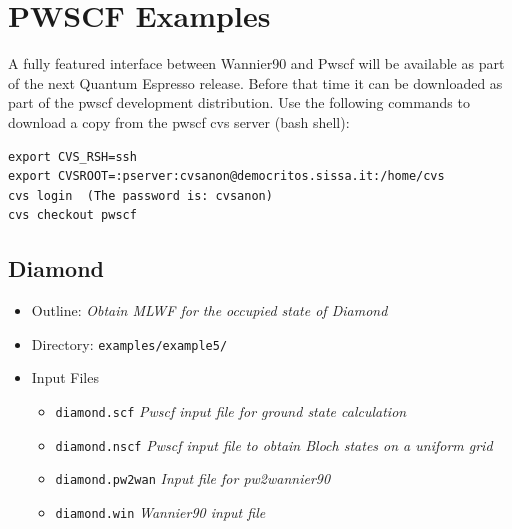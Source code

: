 \documentclass[a4paper,11pt,twoside]{article}
\begin{document}
\cleardoublepage

\section*{PWSCF Examples}

A fully featured interface between Wannier90 and Pwscf will be available as part of the 
next Quantum Espresso release. Before that time it can be downloaded as part of the
pwscf development distribution. Use the following commands to download a copy from the
pwscf cvs server (bash shell):
\begin{verbatim}
export CVS_RSH=ssh
export CVSROOT=:pserver:cvsanon@democritos.sissa.it:/home/cvs
cvs login  (The password is: cvsanon)
cvs checkout pwscf
\end{verbatim}

\subsection*{Diamond}
\begin{itemize}
\item{Outline: \it{Obtain MLWF for the occupied state of Diamond}}
\item{Directory: {\tt examples/example5/}}
\item{Input Files}
\begin{itemize}
\item{ {\tt diamond.scf}  {\it Pwscf input file for ground state calculation}}
\item{ {\tt diamond.nscf}  {\it Pwscf input file to obtain Bloch states on a uniform grid}}
\item{ {\tt diamond.pw2wan}  {\it Input file for pw2wannier90}}
\item{ {\tt diamond.win}  {\it Wannier90 input file}}
\end{itemize}

\end{itemize}
\end{document}
